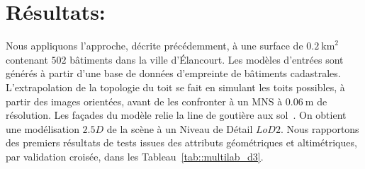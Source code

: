 \documentclass[a4paper,french]{article}
\begin{document}
    \section{Résultats:}

    Nous appliquons l'approche, décrite précédemment, à une surface de $\SI{0.2}{\km \squared}$ contenant $502$ bâtiments dans la ville d'\'Elancourt. Les modèles d'entrées sont générés à partir d'une base de données d'empreinte de bâtiments cadastrales. L'extrapolation de la topologie du toit se fait en simulant les toits possibles, à partir des images orientées, avant de les confronter à un MNS à $\SI{0.06}{\m}$ de résolution. Les façades du modèle relie la line de goutière aux sol~\cite{Durupt2006}. On obtient une modélisation $2.5D$ de la scène à un Niveau de Détail $LoD 2$. Nous rapportons des premiers résultats de tests issues des attributs géométriques et altimétriques, par validation croisée, dans les Tableau~\ref{tab::multilab_d3}.
\end{document}

